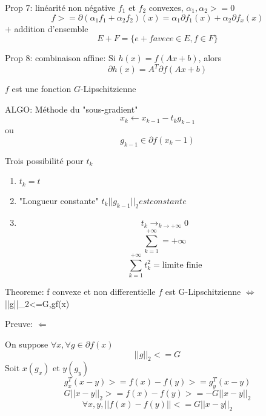 \documentclass{article}
\begin{document}
Prop 7: lin\'earit\'e non n\'egative
$f_1$ et $f_2$ convexes, $\alpha_1,\alpha_2>=0$
\begin{equation}
f>=\partial(\alpha_1 f_1+\alpha_2 f_2)(x)=\alpha_1 \partial f_1(x)+\alpha_2 \partial f_x(x)
\end{equation}
$+$ addition d'ensemble
\begin{equation}
E+F=\{e+f avec e\in E,f\in F\}
\end{equation}

Prop 8: combinaison affine:
Si $h(x)=f(Ax+b)$, alors
\begin{equation}
\partial h(x)=A^T\partial f(Ax+b)
\end{equation}

$f$ est une fonction $G$-Lipschitzienne

ALGO: M\'ethode du "sous-gradient"
\begin{equation}
x_k\leftarrow x_{k-1}-t_k g_{k-1}
\end{equation}
ou
\begin{equation}
g_{k-1}\in\partial f(x_k-1)
\end{equation}

Trois possibilit\'e pour $t_k$
\begin{enumerate}
\item $t_k=t$
\item "Longueur constante" $t_k||g_{k-1}||_2 est constante$
\item 
\begin{equation}
t_k\to_{k\to +\infty} 0
\end{equation}
\begin{equation}
\sum_{k=1}^{+\infty}=+\infty
\end{equation}
\begin{equation}
\sum_{k=1}^{+\infty} t_k^2=\text{limite finie}
\end{equation}
\end{enumerate}

Theoreme: f convexe et non differentielle
$f$ est G-Lipschitzienne $\Leftrightarrow$ ||g||_2<=G,\forall g\in\partial f(x)

Preuve:
$\Leftarrow$

On suppose $\forall x, \forall g\in\partial f(x)$
\begin{equation}
||g||_2<=G
\end{equation}
Soit $x(g_x)$ et $y(g_y)$
\begin{equation}
g_x^T(x-y)>=f(x)-f(y)>=g_y^T(x-y)
\end{equation}
\begin{equation}
G||x-y||_2>=f(x)-f(y)>=-G||x-y||_2
\end{equation}
\begin{equation}
\forall x,y, ||f(x)-f(y)||<=G||x-y||_2
\end{equation}
\end{document}
